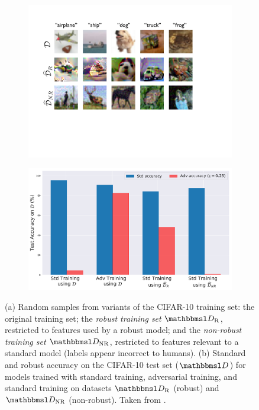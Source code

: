 \documentclass{article}
\begin{document}
\begin{figure}
	\centering
	\begin{subfigure}[b]{0.45\textwidth}
		\centering
		\includegraphics[width=1.0\textwidth]{figures/adversarial-examples/ilyas/cifar_datasets.pdf}
		\vfill\null
		\caption{}
		\label{fig:robust_inputs}
	\end{subfigure}
	\hfill
	\begin{subfigure}[b]{0.5\textwidth}
		\centering
		\includegraphics[width=\textwidth]{figures/adversarial-examples/ilyas/CIFAR_res.pdf}
		\caption{}
		\label{fig:robustify_cifar}
	\end{subfigure}
	\caption{
		(a) Random samples from variants of the
		CIFAR-10 training set:
		the original training set; 
		the \textit{robust training set} $\set D_\text{R}$, restricted to features used by a
		robust model; and
		the \textit{non-robust training set} $\set D_\text{NR}$, restricted to
		features relevant to a standard model (labels appear incorrect to humans).
		(b) Standard and robust accuracy on the CIFAR-10
		test set ($\set D$) for models trained with standard training, adversarial training, and standard training on datasets $\set D_\text{R}$ (robust) and $\set D_\text{NR}$ (non-robust). Taken from \citet{Ilyas:2019:AENBTF}.}
	\label{fig:iliyas-experiment-results}
\end{figure}
\end{document}
